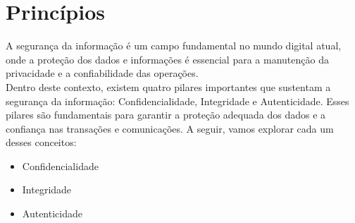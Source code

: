\section{Princípios}

A segurança da informação é um campo fundamental no mundo digital atual, onde a proteção dos dados e informações é essencial para a manutenção da privacidade e a confiabilidade das operações.\\
Dentro deste contexto, existem quatro pilares importantes que sustentam a segurança da informação: Confidencialidade, Integridade e Autenticidade. Esses pilares são fundamentais para garantir a proteção adequada dos dados e a confiança nas transações e comunicações. A seguir, vamos explorar cada um desses conceitos:

\begin{itemize}
	\item Confidencialidade
	\item Integridade
	\item Autenticidade
\end{itemize}

\pagebreak
